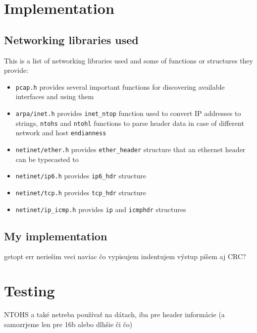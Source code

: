 \documentclass[a4paper]{article}
\begin{document}
  \vspace{1cm}


  \section{Implementation}

  \subsection{Networking libraries used}

  This is a list of networking libraries used and some of functions or 
  structures they provide:
  \begin{itemize}
    \item \verb|pcap.h| provides several important functions for discovering
      available interfaces and using them
    \item \verb|arpa/inet.h| provides \verb|inet_ntop| function used to 
      convert IP addresses to strings, \verb|ntohs| and \verb|ntohl|
      functions to parse header data in case of different network and host 
      \verb|endianness|
    \item \verb|netinet/ether.h| provides \verb|ether_header| structure
      that an ethernet header can be typecasted to
    \item \verb|netinet/ip6.h| provides \verb|ip6_hdr| structure
    \item \verb|netinet/tcp.h| provides \verb|tcp_hdr| structure
    \item \verb|netinet/ip_icmp.h| provides \verb|ip| and \verb|icmphdr|
      structures
  \end{itemize}


  \subsection{My implementation}
  getopt err neriešim
  veci naviac čo vypisujem
  indentujem výstup
  píšem aj CRC?


  \section{Testing}

  NTOHS a také netreba používať na dátach, iba pre header informácie (a samozrjeme len pre 16b alebo dlhšie či čo)
\end{document}
